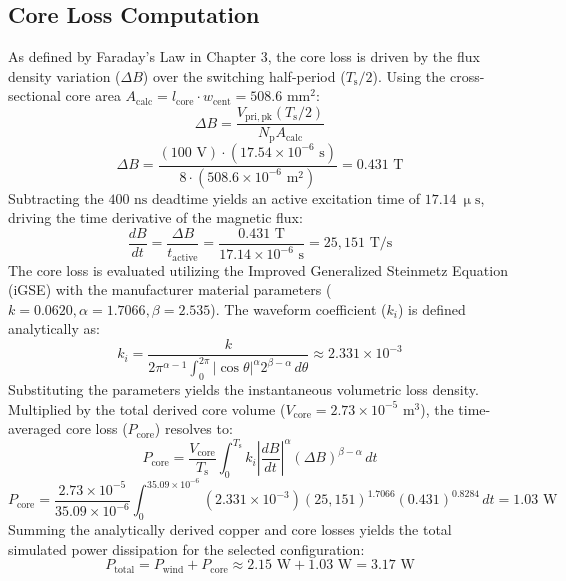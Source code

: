 \subsection*{Core Loss Computation}
As defined by Faraday's Law in Chapter 3, the core loss is driven by the flux density variation ($\Delta B$) over the switching half-period ($T_{\mathrm{s}}/2$). Using the cross-sectional core area $A_{\mathrm{calc}} = l_{\mathrm{core}} \cdot w_{\mathrm{cent}} = 508.6 \text{ mm}^2$:
$$\Delta B = \frac{V_{\mathrm{pri,pk}} (T_{\mathrm{s}}/2)}{N_{\mathrm{p}} A_{\mathrm{calc}}}$$
$$\Delta B = \frac{(100 \text{ V}) \cdot (17.54 \times 10^{-6} \text{ s})}{8 \cdot (508.6 \times 10^{-6} \text{ m}^2)} = 0.431 \text{ T}$$
Subtracting the $400 \text{ ns}$ deadtime yields an active excitation time of $17.14 \ \upmu\text{s}$, driving the time derivative of the magnetic flux:
$$\frac{dB}{dt} = \frac{\Delta B}{t_{\mathrm{active}}} = \frac{0.431 \text{ T}}{17.14 \times 10^{-6} \text{ s}} = 25,151 \text{ T/s}$$
The core loss is evaluated utilizing the Improved Generalized Steinmetz Equation (iGSE) with the manufacturer material parameters ($k = 0.0620, \alpha = 1.7066, \beta = 2.535$). The waveform coefficient ($k_i$) is defined analytically as:
$$k_i = \frac{k}{2\pi^{\alpha-1} \int_{0}^{2\pi} \vert \cos \theta \vert^{\alpha} 2^{\beta-\alpha} \, d\theta} \approx 2.331 \times 10^{-3}$$
Substituting the parameters yields the instantaneous volumetric loss density. Multiplied by the total derived core volume ($V_{\mathrm{core}} = 2.73 \times 10^{-5} \text{ m}^3$), the time-averaged core loss ($P_{\mathrm{core}}$) resolves to:
$$P_{\mathrm{core}} = \frac{V_{\mathrm{core}}}{T_{\mathrm{s}}} \int_{0}^{T_{\mathrm{s}}} k_i \left| \frac{dB}{dt} \right|^{\alpha} (\Delta B)^{\beta-\alpha} \, dt$$
$$P_{\mathrm{core}} = \frac{2.73 \times 10^{-5}}{35.09 \times 10^{-6}} \int_{0}^{35.09 \times 10^{-6}} (2.331 \times 10^{-3}) (25,151)^{1.7066} (0.431)^{0.8284} \, dt = 1.03 \text{ W}$$
Summing the analytically derived copper and core losses yields the total simulated power dissipation for the selected configuration:
$$P_{\mathrm{total}} = P_{\mathrm{wind}} + P_{\mathrm{core}} \approx 2.15 \text{ W} + 1.03 \text{ W} = 3.17 \text{ W}$$